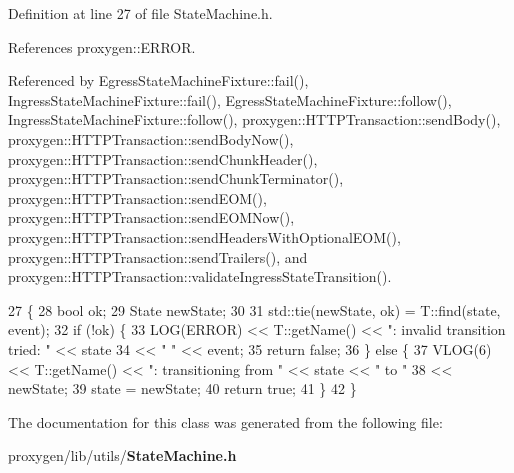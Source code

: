 Definition at line 27 of file State\+Machine.\+h.



References proxygen\+::\+E\+R\+R\+OR.



Referenced by Egress\+State\+Machine\+Fixture\+::fail(), Ingress\+State\+Machine\+Fixture\+::fail(), Egress\+State\+Machine\+Fixture\+::follow(), Ingress\+State\+Machine\+Fixture\+::follow(), proxygen\+::\+H\+T\+T\+P\+Transaction\+::send\+Body(), proxygen\+::\+H\+T\+T\+P\+Transaction\+::send\+Body\+Now(), proxygen\+::\+H\+T\+T\+P\+Transaction\+::send\+Chunk\+Header(), proxygen\+::\+H\+T\+T\+P\+Transaction\+::send\+Chunk\+Terminator(), proxygen\+::\+H\+T\+T\+P\+Transaction\+::send\+E\+O\+M(), proxygen\+::\+H\+T\+T\+P\+Transaction\+::send\+E\+O\+M\+Now(), proxygen\+::\+H\+T\+T\+P\+Transaction\+::send\+Headers\+With\+Optional\+E\+O\+M(), proxygen\+::\+H\+T\+T\+P\+Transaction\+::send\+Trailers(), and proxygen\+::\+H\+T\+T\+P\+Transaction\+::validate\+Ingress\+State\+Transition().


\begin{DoxyCode}
27                                                  \{
28     \textcolor{keywordtype}{bool} ok;
29     State newState;
30 
31     std::tie(newState, ok) = T::find(state, event);
32     \textcolor{keywordflow}{if} (!ok) \{
33       LOG(ERROR) << T::getName() << \textcolor{stringliteral}{": invalid transition tried: "} << state
34                  << \textcolor{stringliteral}{" "} << event;
35       \textcolor{keywordflow}{return} \textcolor{keyword}{false};
36     \} \textcolor{keywordflow}{else} \{
37       VLOG(6) << T::getName() << \textcolor{stringliteral}{": transitioning from "} << state << \textcolor{stringliteral}{" to "}
38               << newState;
39       state = newState;
40       \textcolor{keywordflow}{return} \textcolor{keyword}{true};
41     \}
42   \}
\end{DoxyCode}


The documentation for this class was generated from the following file\+:\begin{DoxyCompactItemize}
\item 
proxygen/lib/utils/{\bf State\+Machine.\+h}\end{DoxyCompactItemize}
